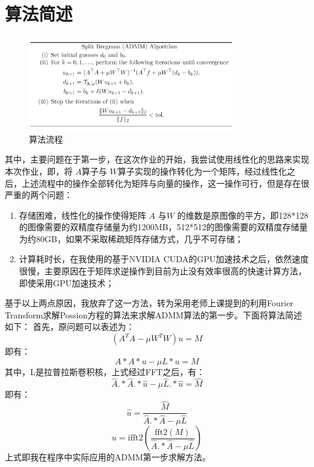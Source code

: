 \documentclass[a4paper, UTF8]{ctexrep}
\begin{document}
	\section{算法简述}
		\begin{figure}[htbp!]
			\centering
			\includegraphics[width=0.8\textwidth]{fig1.png}
			\caption{算法流程}
		\end{figure}
		其中，主要问题在于第一步，在这次作业的开始，我尝试使用线性化的思路来实现本次作业，即，将 $A$算子与 $W$算子实现的操作转化为一个矩阵，经过线性化之后，上述流程中的操作全部转化为矩阵与向量的操作，这一操作可行，但是存在很严重的两个问题：
		\begin{enumerate}
			\item 存储困难，线性化的操作使得矩阵 $A$ 与$W$ 的维数是原图像的平方，即128*128的图像需要的双精度存储量为约1200MB，512*512的图像需要的双精度存储量为约80GB，如果不采取稀疏矩阵存储方式，几乎不可存储；
			\item 计算耗时长，在我使用的基于NVIDIA CUDA的GPU加速技术之后，依然速度很慢，主要原因在于矩阵求逆操作到目前为止没有效率很高的快速计算方法，即使采用GPU加速技术；
		\end{enumerate}
		基于以上两点原因，我放弃了这一方法，转为采用老师上课提到的利用Fourier Transform求解Possion方程的算法来求解ADMM算法的第一步。下面将算法简述如下：
		首先，原问题可以表述为：
		\begin{equation}
			\left( A^T A - \mu W^T W \right) u = M
		\end{equation}
		即有：
		\begin{equation}
			A * A * u - \mu L * u = M
		\end{equation}
		其中，L是拉普拉斯卷积核，上式经过FFT之后，有：
		\begin{equation}
			\hat A .* \hat A .* \hat u - \mu \hat L .* \hat u = \hat M
		\end{equation}
		即有：
		\begin{equation}
			\hat u = \frac{\hat M}{\hat A .* \hat A - \mu \hat L}
		\end{equation}
		\begin{equation}
			u = \mathrm{ifft2} \left( \frac{\mathrm{fft2} \left( M \right)}{\hat A .* \hat A - \mu \hat L} \right)
		\end{equation}
		上式即我在程序中实际应用的ADMM第一步求解方法。
\end{document}
